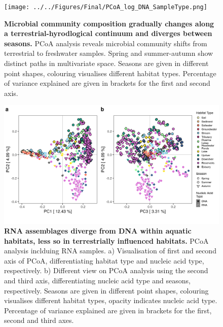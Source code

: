 \documentclass[12pt,a4paper]{article} %
\begin{document}
\begin{figure}[!ht]
\centering
\texttt{[image: ../../Figures/Final/PCoA\_log\_DNA\_SampleType.png]}
\caption{\textbf{Microbial community composition gradually changes along a terrestrial-hyrodlogical continuum and diverges between seasons.} PCoA analysis reveals microbial community shifts from terrestrial to freshwater samples. Spring and summer-autumn show distinct paths in multivariate space. Seasons are given in different point shapes, colouring visualises different habitat types. Percentage of variance explained are given in brackets for the first and second axis.}
\end{figure}

\begin{figure}[!ht]
\centering
\includegraphics[width=17cm]{../../Figures/Final/PCoA_all_SampleType.png}
\caption{\textbf{RNA assemblages diverge from DNA within aquatic habitats, less so in terrestrially influenced habitats.} PCoA analysis inclduing RNA samples. a) Visualisation of first and second axis of PCoA, differentiating habitat type and nucleic acid type, respectively. b) Different view on PCoA analysis using the second and third axis, differentiating nucleic acid type and seasons, respectively. Seasons are given in different point shapes, colouring visualises different habitat types, opacity indicates nucleic acid type. Percentage of variance explained are given in brackets for the first, second and third axes.}
\end{figure}
\end{document}
